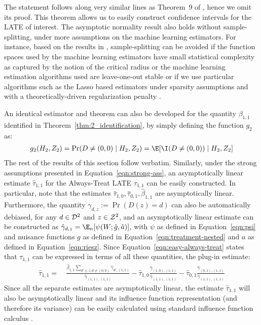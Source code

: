 \noindent The statement follows along very similar lines as Theorem~9 of \citep{chernozhukov2022automatic}, hence we omit its proof. This theorem allows us to easily construct confidence intervals for the LATE of interest. The asymptotic normality result also holds without sample-splitting, under more assumptions on the machine learning estimators. For instance, based on the results in \citep{belloni2017program,chernozhukov2020adversarial,chen2022debiased}, sample-splitting can be avoided if the function spaces used by the machine learning estimators have small statistical complexity as captured by the notion of the critical radius \citep{chernozhukov2022automatic} or the machine learning estimation algorithms used are leave-one-out stable \citep{chen2022debiased} or if we use particular algorithms such as the Lasso based estimators under sparsity assumptions and with a theoretically-driven regularization penalty \citep{belloni2017program}.

An identical estimator and theorem can also be developed for the quantity $\beta_{1,1}$ identified in Theorem~\ref{thm:2_identification}, by simply defining the function $g_2$ as:
\begin{align}
    g_2(H_2, Z_2) = \Pr(D\neq (0,0)\mid H_2, Z_2) = \E[\I(D\neq (0,0))\mid H_2, Z_2]
\end{align}
The rest of the results of this section follow verbatim. Similarly, under the strong assumptions presented in Equation~\eqref{eqn:strong-ass}, an asymptotically linear estimate $\hat{\tau}_{1,1}$ for the Always-Treat LATE $\tau_{1,1}$ can be easily constructed. In particular, note that the estimates $\hat{\tau}_{1,0}, \hat{\tau}_{0,1}, \hat{\beta}_{1,1}$ are asymptotically linear. Furthermore, the quantity $\gamma_{d,z}:=\Pr(D(z)=d)$ can also be automatically debiased, for any $d\in {\cal D}^2$ and $z\in {\cal Z}^2$, and an asymptotically linear estimate can be constructed as $\hat{\gamma}_{d,z} = \E_n[\psi(W;\hat{g}, \hat{a})]$, with $\psi$ as defined in Equation~\eqref{eqn:psi} and nuisance functions $g$ as defined in Equation~\eqref{eqn:treatment-nested} and $a$ as defined in Equation~\eqref{eqn:riesz}. Since Equation~\eqref{eqn:easy-always-treat} states that $\tau_{1,1}$ can be expressed in terms of all these quantities, the plug-in estimate:
\begin{align*}
    \hat{\tau}_{1,1} =~& \frac{\hat{\beta}_{1,1} \sum_{d'\leq z:d\neq (0,0)} \hat{\gamma}_{d',(1,1)}}{\hat{\gamma}_{(1,1),(1,1)}} - \hat{\tau}_{1,0} \frac{\hat{\gamma}_{(1,0), (1,1)}}{\hat{\gamma}_{(1,1),(1,1)}} - \hat{\tau}_{0,1} \frac{\hat{\gamma}_{(0,1), (1,1)}}{\hat{\gamma}_{(1,1),(1,1)}}
\end{align*}
Since all the separate estimates are asymptotically linear, the estimate $\hat{\tau}_{1,1}$ will also be asymptotically linear and its influence function representation (and therefore its variance) can be easily calculated using standard influence function calculus \citep{newey1994large}.

